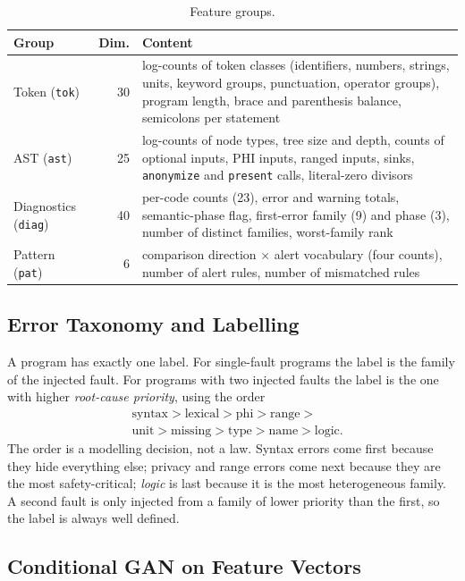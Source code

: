 \documentclass[conference]{IEEEtran}
\newcommand{\code}[1]{\texttt{#1}}
\begin{document}
\begin{table}[t]
\centering
\caption{Feature groups.}
\label{tab:features}
\footnotesize
\begin{tabular}{lrp{5.3cm}}
\toprule
\textbf{Group} & \textbf{Dim.} & \textbf{Content}\\
\midrule
Token (\code{tok}) & 30 & log-counts of token classes (identifiers, numbers, strings, units, keyword groups,
punctuation, operator groups), program length, brace and parenthesis balance, semicolons per statement\\
AST (\code{ast}) & 25 & log-counts of node types, tree size and depth, counts of optional inputs, PHI inputs, ranged
inputs, sinks, \code{anonymize} and \code{present} calls, literal-zero divisors\\
Diagnostics (\code{diag}) & 40 & per-code counts (23), error and warning totals, semantic-phase flag, first-error
family (9) and phase (3), number of distinct families, worst-family rank\\
Pattern (\code{pat}) & 6 & comparison direction $\times$ alert vocabulary (four counts), number of alert rules, number
of mismatched rules\\
\bottomrule
\end{tabular}
\end{table}

\subsection{Error Taxonomy and Labelling}

A program has exactly one label. For single-fault programs the label is the family of the injected fault. For
programs with two injected faults the label is the one with higher \emph{root-cause priority}, using the order
\begin{align*}
&\text{syntax}>\text{lexical}>\text{phi}>\text{range}>\\
&\text{unit}>\text{missing}>\text{type}>\text{name}>\text{logic}.
\end{align*}
The order is a modelling decision, not a law. Syntax errors come first because they hide everything else; privacy
and range errors come next because they are the most safety-critical; \emph{logic} is last because it is the most
heterogeneous family. A second fault is only injected from a family of lower priority than the first, so the label is
always well defined.

\subsection{Conditional GAN on Feature Vectors}
\end{document}
